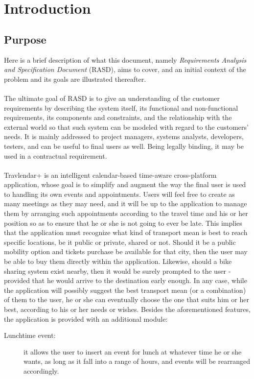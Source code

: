 \chapter{Introduction}
\label{cha:intro}

\section{Purpose}
\label{sec:purpose}
Here is a brief description of what this document, namely \textit{Requirements Analysis and Specification Document} (RASD), aims to cover, and an initial context of the problem and its goals are illustrated thereafter. \\\\
The ultimate goal of RASD is to give an understanding of the customer requirements by describing the system itself, its functional and non-functional requirements, its components and constraints, and the relationship with the external world so that such system can be modeled with regard to the customers' needs. It is mainly addressed to project managers, systems analysts, developers, testers, and can be useful to final users as well. Being legally binding, it may be used in a contractual requirement.\\\\
Travlendar+ is an intelligent calendar-based time-aware cross-platform application, whose goal is to simplify and augment the way the final user is used to handling its own events and appointments. Users will feel free to create as many meetings as they may need, and it will be up to the application to manage them by arranging such appointments according to the travel time and his or her position so as to ensure that he or she is not going to ever be late. This implies that the application must recognize what kind of transport mean is best to reach specific locations, be it public or private, shared or not. Should it be a public mobility option and tickets purchase be available for that city, then the user may be able to buy them directly within the application. Likewise, should a bike sharing system exist nearby, then it would be surely prompted to the user - provided that he would arrive to the destination early enough. In any case, while the application will possibly suggest the best transport mean (or a combination) of them to the user, he or she can eventually choose the one that suits him or her best, according to his or her needs or wishes.
Besides the aforementioned features, the application is provided with an additional module:
\begin{description}
\item[Lunchtime event:] it allows the user to insert an event for lunch at whatever time he or she wants, as long as it fall into a range of hours, and events will be rearranged accordingly.
\end{description}
